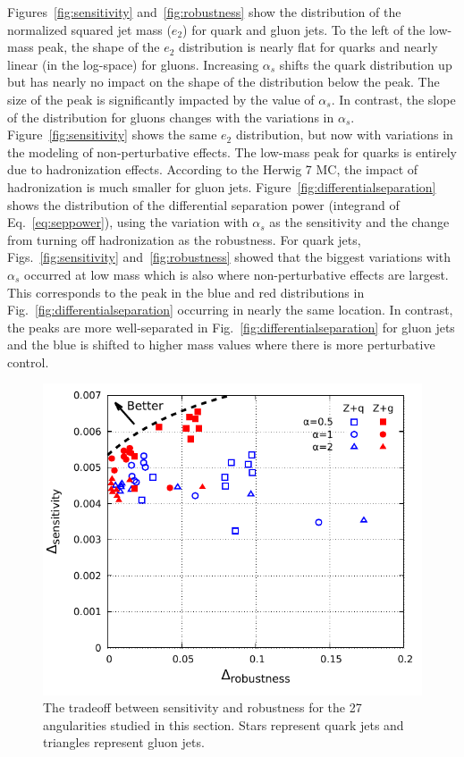 Figures~\ref{fig:sensitivity} and~\ref{fig:robustness} show the distribution of the normalized squared jet mass ($e_2$) for quark and gluon jets.  To the left of the low-mass peak, the shape of the $e_2$ distribution is nearly flat for quarks and nearly linear (in the log-space) for gluons.  Increasing $\alpha_s$ shifts the quark distribution up but has nearly no impact on the shape of the distribution below the peak.  The size of the peak is significantly impacted by the value of $\alpha_s$.  In contrast, the slope of the distribution for gluons changes with the variations in $\alpha_s$.  Figure~\ref{fig:sensitivity} shows the same $e_2$ distribution, but now with variations in the modeling of non-perturbative effects.  The low-mass peak for quarks is entirely due to hadronization effects.  According to the Herwig 7 MC, the impact of hadronization is much smaller for gluon jets.  Figure~\ref{fig:differentialseparation} shows the distribution of the differential separation power (integrand of Eq.~\ref{eq:seppower}), using the variation with $\alpha_s$ as the sensitivity and the change from turning off hadronization as the robustness.  For quark jets, Figs.~\ref{fig:sensitivity} and~\ref{fig:robustness} showed that the biggest variations with $\alpha_s$ occurred at low mass which is also where non-perturbative effects are largest.  This corresponds to the peak in the blue and red distributions in Fig.~\ref{fig:differentialseparation} occurring in nearly the same location.  In contrast, the peaks are more well-separated in Fig.~\ref{fig:differentialseparation} for gluon jets and the blue is shifted to higher mass values where there is more perturbative control.  

\begin{figure}[h!]
\begin{center}
\includegraphics[width = 0.6\columnwidth]{figures/robsep.pdf}
\end{center}
\caption{The tradeoff between sensitivity and robustness for the 27
  angularities studied in this section.  Stars represent quark jets and triangles represent gluon
  jets.}
\label{fig:robseptradeoff}
\end{figure}

